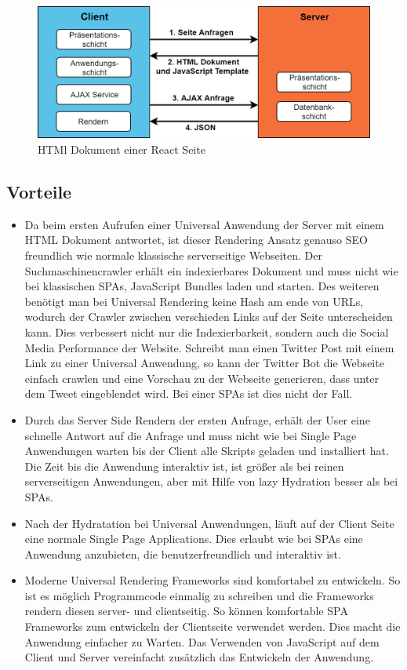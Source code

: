 \documentclass[runningheads]{llncs}
\begin{document}
\begin{figure}[h]
  \centering
  \includegraphics[width=12cm]{images/universal}
  \caption{HTMl Dokument einer React Seite}
\end{figure}

\newpage
\subsection{Vorteile}
\label{subsec:Vorteile}

\begin{itemize}
  \item Da beim ersten Aufrufen einer Universal Anwendung der Server mit einem HTML Dokument antwortet, 
  ist dieser Rendering Ansatz genauso SEO freundlich wie normale klassische serverseitige Webseiten. 
  Der Suchmaschinencrawler erhält ein indexierbares Dokument und muss nicht wie bei klassischen SPAs, 
  JavaScript Bundles laden und starten. 
  Des weiteren benötigt man bei Universal Rendering keine Hash am ende von URLs, 
  wodurch der Crawler zwischen verschieden Links auf der Seite unterscheiden kann. 
  Dies verbessert nicht nur die Indexierbarkeit, 
  sondern auch die Social Media Performance der Website. 
  Schreibt man einen Twitter Post mit einem Link zu einer Universal Anwendung, 
  so kann der Twitter Bot die Webseite einfach crawlen und eine Vorschau zu der Webseite generieren, 
  dass unter dem Tweet eingeblendet wird. 
  Bei einer SPAs ist dies nicht der Fall.
  \item Durch das Server Side Rendern der ersten Anfrage, 
  erhält der User eine schnelle Antwort auf die Anfrage und 
  muss nicht wie bei Single Page Anwendungen warten bis der Client alle Skripts geladen und 
  installiert hat. Die Zeit bis die Anwendung interaktiv ist, 
  ist größer als bei reinen serverseitigen Anwendungen, 
  aber mit Hilfe von lazy Hydration besser als bei SPAs. 
  \item Nach der Hydratation bei Universal Anwendungen, 
  läuft auf der Client Seite eine normale Single Page Applications. 
  Dies erlaubt wie bei SPAs eine Anwendung anzubieten, 
  die benutzerfreundlich und interaktiv ist.
  \item Moderne Universal Rendering Frameworks sind komfortabel zu entwickeln. 
  So ist es möglich Programmcode einmalig zu schreiben und 
  die Frameworks rendern diesen server- und clientseitig. 
  So können komfortable SPA Frameworks zum entwickeln der Clientseite verwendet werden. 
  Dies macht die Anwendung einfacher zu Warten. 
  Das Verwenden von JavaScript auf dem Client und 
  Server vereinfacht zusätzlich das Entwickeln der Anwendung.
  
\end{itemize}
\end{document}
